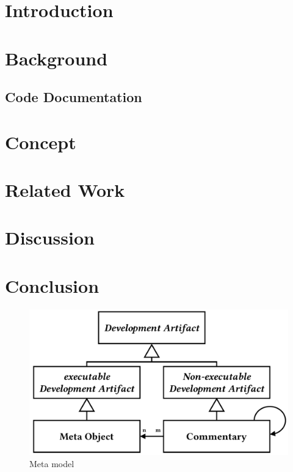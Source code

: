 \section{Introduction}

\section{Background}

\subsection{Code Documentation}

\section{Concept}

\section{Related Work}

\section{Discussion}

\section{Conclusion}

\begin{figure}
\includegraphics[width=\columnwidth]{images/metamodel}
\caption{Meta model}
\end{figure}

